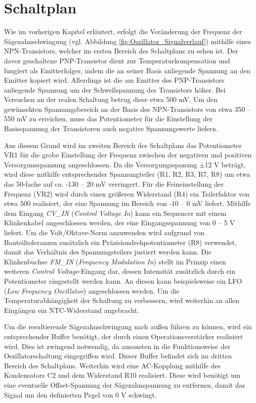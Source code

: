 \section{Schaltplan}
Wie im vorherigen Kapitel erläutert, erfolgt die Veränderung der Frequenz der Sägezahnschwingung (vgl. Abbildung  \ref{fig:Oszillator_Signalverlauf}) mithilfe eines NPN-Transistors, welcher im ersten Bereich des Schaltplans zu sehen ist. 
Der davor geschaltene PNP-Transistor dient zur Temperaturkompensation und fungiert als Emitterfolger, indem die an seiner Basis anliegende Spannung an den Emitter kopiert wird.
Allerdings ist die am Emitter des PNP-Transistors anliegende Spannung um der Schwellspannung des Transistors höher.
Bei Versuchen an der realen Schaltung betrug diese etwa 500 mV.
Um den gewünschten Spannungsbereich an der Basis des NPN-Transistors von etwa 350 -- 550 mV zu erreichen, muss das Potentiometer für die Einstellung der Basisspannung der Transistoren auch negative Spannungswerte liefern.

Aus diesem Grund wird im zweiten Bereich des Schaltplans das Potentiometer VR1 für die grobe Einstellung der Frequenz zwischen der negativen und positiven Versorgunsspannung angeschlossen.
Da die Versorgungsspanung $\pm$12 V beträgt, wird diese mithilfe entsprechender Spannungteiler (R1, R2, R3, R7, R8) um etwa das 50-fache auf ca. -130 -- 20 mV verringert.
Für die Feineinstellung der Frequenz (VR2) wird durch einen größeren Widerstand (R4) ein Teilerfaktor von etwa 500 realisiert, der eine Spannung im Bereich von -10 -- 0 mV liefert.
Mithilfe dem Eingang \textit{CV\_IN} (\textit{Control Voltage In}) kann ein Sequencer mit einem Klinkenkabel angeschlossen werden, der eine Eingangsspannung von 0 -- 5 V liefert.
Um die Volt/Oktave-Norm anzuwenden wird aufgrund von Bauteiltoleranzen zusätzlich ein Präzisiondrehpotentiometer (R8) verwendet, damit das Verhältnis des Spannungsteilers justiert werden kann.
Die Klinkenbuchse \textit{FM\_IN} (\textit{Frequency Modulation In}) stellt im Prinzip einen weiteren \textit{Control Voltage}-Eingang dar, dessen Intensität zusätzlich durch ein Potentiometer eingestellt werden kann. 
An diesen kann beispielsweise ein LFO (\textit{Low Frequency Oscillator}) angeschlossen werden.
Um die Temperaturabhängigkeit der Schaltung zu verbessern, wird weiterhin an allen Eingängen ein NTC-Widerstand angebracht.

Um die resultierende Sägezahnschwingung nach außen führen zu können, wird ein entsprechender Buffer benötigt, der durch einen Operationsverstärker realisiert wird.
Dies ist zwingend notwendig, da ansonsten in die Funktionsweise der Oszillatorschaltung eingegriffen wird. 
Dieser Buffer befindet sich im dritten Bereich des Schaltplans.
Weiterhin wird eine AC-Kopplung mithilfe des Kondensators C2 und dem Widerstand R10 realisiert. 
Diese wird benötigt um eine eventuelle Offset-Spannung der Sägezahnspannung zu entfernen, damit das Signal um den definierten Pegel von 0 V schwingt.


